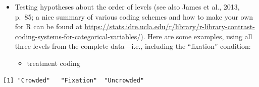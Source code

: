 \documentclass[
]{article}
\newenvironment{Shaded}{\begin{snugshade}}{\end{snugshade}}
\newcommand{\DataTypeTok}[1]{\textcolor[rgb]{0.13,0.29,0.53}{#1}}
\newcommand{\DecValTok}[1]{\textcolor[rgb]{0.00,0.00,0.81}{#1}}
\newcommand{\KeywordTok}[1]{\textcolor[rgb]{0.13,0.29,0.53}{\textbf{#1}}}
\newcommand{\NormalTok}[1]{#1}
\newcommand{\OperatorTok}[1]{\textcolor[rgb]{0.81,0.36,0.00}{\textbf{#1}}}
\newcommand{\StringTok}[1]{\textcolor[rgb]{0.31,0.60,0.02}{#1}}
\providecommand{\tightlist}{%
  \setlength{\itemsep}{0pt}\setlength{\parskip}{0pt}}
\begin{document}
\normalsize

\begin{itemize}
\item
  Testing hypotheses about the order of levels (see also James et al.,
  2013, p.~85; a nice summary of various coding schemes and how to make
  your own for R can be found at
  \url{https://stats.idre.ucla.edu/r/library/r-library-contrast-coding-systems-for-categorical-variables/}).
  Here are some examples, using all three levels from the complete
  data---i.e., including the ``fixation'' condition:

  \begin{itemize}
  \tightlist
  \item
    treatment coding
  \end{itemize}
\end{itemize}

\footnotesize

\begin{Shaded}
\end{Shaded}

\begin{verbatim}
[1] "Crowded"   "Fixation"  "Uncrowded"
\end{verbatim}

\begin{Shaded}
\end{Shaded}
\end{document}
